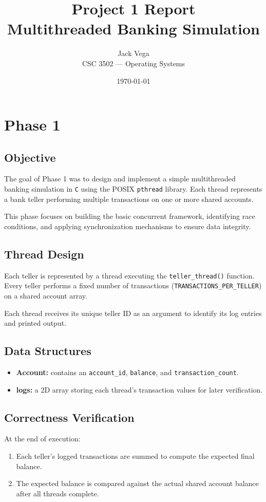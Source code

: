\documentclass[12pt]{article}
\title{\textbf{Project 1 Report\\Multithreaded Banking Simulation}}
\author{Jack Vega \\ CSC 3502 — Operating Systems}
\date{\today}
\begin{document}
\maketitle


\section{Phase 1}
\subsection{Objective}
The goal of Phase 1 was to design and implement a simple multithreaded banking simulation in \texttt{C} using the POSIX \texttt{pthread} library.
Each thread represents a bank teller performing multiple transactions on one or more shared accounts.

This phase focuses on building the basic concurrent framework, identifying race conditions, and applying synchronization mechanisms to ensure data integrity.

\subsection{Thread Design}
Each teller is represented by a thread executing the \texttt{teller\_thread()} function.
Every teller performs a fixed number of transactions (\texttt{TRANSACTIONS\_PER\_TELLER}) on a shared account array.

Each thread receives its unique teller ID as an argument to identify its log entries and printed output.

\subsection{Data Structures}
\begin{itemize}
  \item \textbf{Account:} contains an \texttt{account\_id}, \texttt{balance}, and \texttt{transaction\_count}.
  \item \textbf{logs:} a 2D array storing each thread’s transaction values for later verification.
\end{itemize}

\subsection{Correctness Verification}
At the end of execution:
\begin{enumerate}
  \item Each teller’s logged transactions are summed to compute the expected final balance.
  \item The expected balance is compared against the actual shared account balance after all threads complete.
\end{enumerate}
\end{document}
